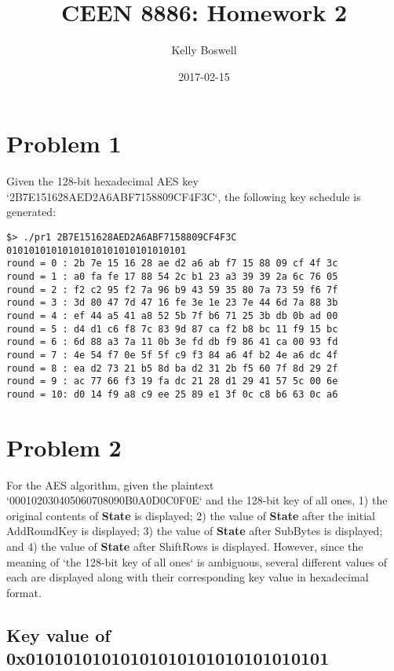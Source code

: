 \documentclass[a4paper]{report}
\title{CEEN 8886: Homework 2}
\date{2017-02-15}
\author{Kelly Boswell}
\begin{document}
\maketitle


\newpage


\section{Problem 1}

Given the 128-bit hexadecimal AES key `2B7E151628AED2A6ABF7158809CF4F3C`, the following key
schedule is generated:

\begin{verbatim}
$> ./pr1 2B7E151628AED2A6ABF7158809CF4F3C 01010101010101010101010101010101
round = 0 : 2b 7e 15 16 28 ae d2 a6 ab f7 15 88 09 cf 4f 3c 
round = 1 : a0 fa fe 17 88 54 2c b1 23 a3 39 39 2a 6c 76 05 
round = 2 : f2 c2 95 f2 7a 96 b9 43 59 35 80 7a 73 59 f6 7f 
round = 3 : 3d 80 47 7d 47 16 fe 3e 1e 23 7e 44 6d 7a 88 3b 
round = 4 : ef 44 a5 41 a8 52 5b 7f b6 71 25 3b db 0b ad 00 
round = 5 : d4 d1 c6 f8 7c 83 9d 87 ca f2 b8 bc 11 f9 15 bc 
round = 6 : 6d 88 a3 7a 11 0b 3e fd db f9 86 41 ca 00 93 fd 
round = 7 : 4e 54 f7 0e 5f 5f c9 f3 84 a6 4f b2 4e a6 dc 4f 
round = 8 : ea d2 73 21 b5 8d ba d2 31 2b f5 60 7f 8d 29 2f 
round = 9 : ac 77 66 f3 19 fa dc 21 28 d1 29 41 57 5c 00 6e 
round = 10: d0 14 f9 a8 c9 ee 25 89 e1 3f 0c c8 b6 63 0c a6
\end{verbatim}

\section{Problem 2}

For the AES algorithm, given the plaintext `000102030405060708090B0A0D0C0F0E` and the
128-bit key of all ones, 1) the original contents of \textbf{State} is displayed; 2) the
value of \textbf{State} after the initial AddRoundKey is displayed; 3) the value of \textbf{State}
after SubBytes is displayed; and 4) the value of \textbf{State} after ShiftRows is displayed. However,
since the meaning of `the 128-bit key of all ones` is ambiguous, several different
values of each are displayed along with their corresponding key value in hexadecimal format.

\subsection{Key value of 0x01010101010101010101010101010101} 
\end{document}
